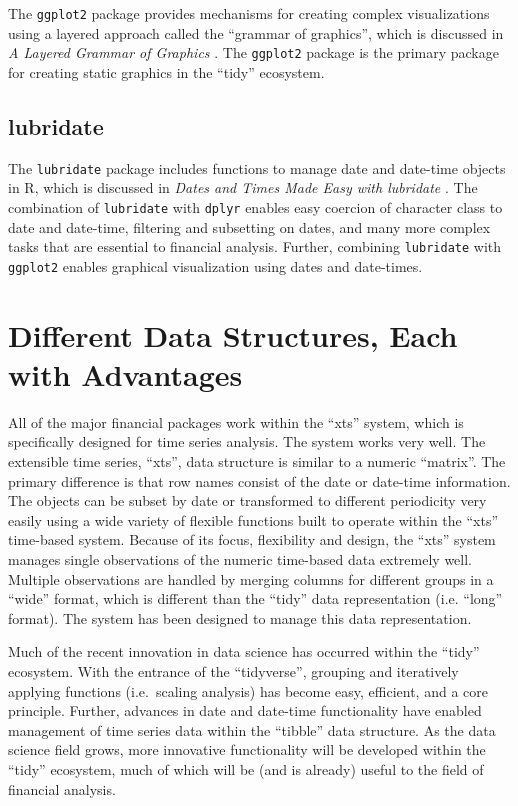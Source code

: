 The \texttt{ggplot2} package provides mechanisms for creating complex
visualizations using a layered approach called the ``grammar of
graphics'', which is discussed in \emph{A Layered Grammar of Graphics}
\citep{layered-grammar}. The \texttt{ggplot2} package is the primary
package for creating static graphics in the ``tidy'' ecosystem.

\subsection{lubridate}\label{lubridate}

The \texttt{lubridate} package includes functions to manage date and
date-time objects in R, which is discussed in \emph{Dates and Times Made
Easy with lubridate} \citep{lubridate}. The combination of
\texttt{lubridate} with \texttt{dplyr} enables easy coercion of
character class to date and date-time, filtering and subsetting on
dates, and many more complex tasks that are essential to financial
analysis. Further, combining \texttt{lubridate} with \texttt{ggplot2}
enables graphical visualization using dates and date-times.

\section{Different Data Structures, Each with
Advantages}\label{different-data-structures-each-with-advantages}

All of the major financial packages work within the ``xts'' system,
which is specifically designed for time series analysis. The system
works very well. The extensible time series, ``xts'', data structure is
similar to a numeric ``matrix''. The primary difference is that row
names consist of the date or date-time information. The objects can be
subset by date or transformed to different periodicity very easily using
a wide variety of flexible functions built to operate within the ``xts''
time-based system. Because of its focus, flexibility and design, the
``xts'' system manages single observations of the numeric time-based
data extremely well. Multiple observations are handled by merging
columns for different groups in a ``wide'' format, which is different
than the ``tidy'' data representation (i.e. ``long'' format). The system
has been designed to manage this data representation.

Much of the recent innovation in data science has occurred within the
``tidy'' ecosystem. With the entrance of the ``tidyverse'', grouping and
iteratively applying functions (i.e.~scaling analysis) has become easy,
efficient, and a core principle. Further, advances in date and date-time
functionality have enabled management of time series data within the
``tibble'' data structure. As the data science field grows, more
innovative functionality will be developed within the ``tidy''
ecosystem, much of which will be (and is already) useful to the field of
financial analysis.

